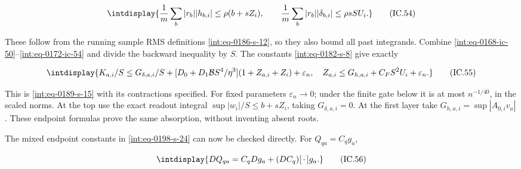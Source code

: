 \begingroup\renewcommand{\theHequation}{intdisplay.359}
\begin{equation}
\intdisplay{
\frac{1}{m}\sum_b|r_b||h_{b,i}|\le\rho(b+sZ_i),\qquad
 \frac{1}{m}\sum_b|r_b||\delta_{b,i}|\le\rho sS U_i.
}
\tag{IC.54}
\label{int:eq-0172-ic-54}
\end{equation}
\endgroup


These follow from the running sample RMS definitions \eqref{int:eq-0186-s-12}, so they also bound all past integrands. Combine \eqref{int:eq-0168-ic-50}--\allowbreak \eqref{int:eq-0172-ic-54} and divide the backward inequality by \(S\). The constants \eqref{int:eq-0182-s-8} give exactly


\begingroup\renewcommand{\theHequation}{intdisplay.360}
\begin{equation}
\intdisplay{
K_{a,i}/S\le G_{\delta,a,i}/S+
 [D_0+D_1\mathcal B S^4/\eta^3](1+Z_{a,i}+Z_i)+\varepsilon_n,
 \quad
 Z_{a,i}\le G_{h,a,i}+C_FS^2U_i+\varepsilon_n.
}
\tag{IC.55}
\label{int:eq-0173-ic-55}
\end{equation}
\endgroup


This is \eqref{int:eq-0189-s-15} with its contractions specified. For fixed parameters \(\varepsilon_n\to0\); under the finite gate below it is at most \(n^{-1/40}\), in the scaled norms. At the top use the exact readout integral \(\sup|w_i|/S\le b+sZ_i\), taking \(G_{\delta,\allowbreak a,\allowbreak i}=0\). At the first layer take \(G_{h,\allowbreak a,\allowbreak i}=\sup|A_{0,\allowbreak i}v_a|\). These endpoint formulas prove the same absorption, without inventing absent roots.



The mixed endpoint constants in \eqref{int:eq-0198-s-24} can now be checked directly. For \(Q_{qa}=C_qg_a\),


\begingroup\renewcommand{\theHequation}{intdisplay.361}
\begin{equation}
\intdisplay{
DQ_{qa}=C_qDg_a+(DC_q)[\,\cdot\,]g_a.
}
\tag{IC.56}
\label{int:eq-0174-ic-56}
\end{equation}
\endgroup



